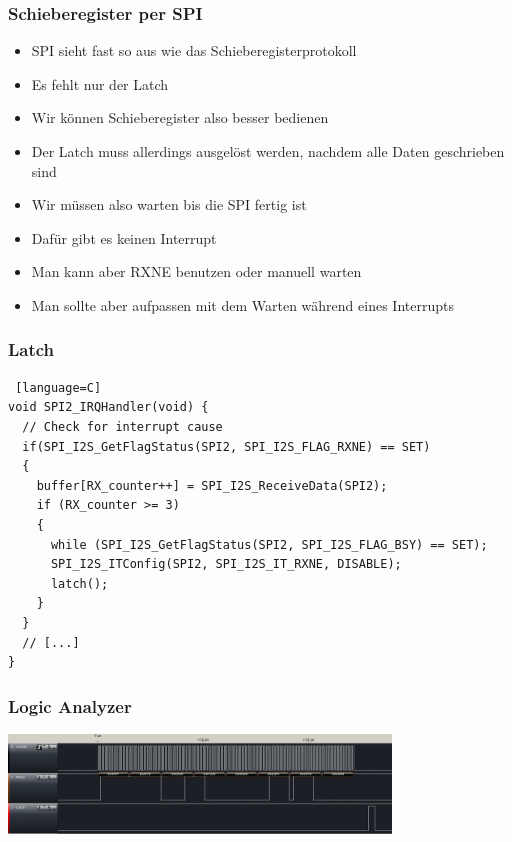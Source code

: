 \documentclass[ngerman,compress]{beamer}
\begin{document}
\begin{frame} [fragile]
	\frametitle{Schieberegister per SPI}
	\begin{itemize}
		\item SPI sieht fast so aus wie das Schieberegisterprotokoll
		\item Es fehlt nur der Latch
		\item Wir können Schieberegister also besser bedienen
		\item Der Latch muss allerdings ausgelöst werden, nachdem alle Daten geschrieben sind
		\item Wir müssen also warten bis die SPI fertig ist
		\item Dafür gibt es keinen Interrupt
		\item Man kann aber RXNE benutzen oder manuell warten
		\item Man sollte aber aufpassen mit dem Warten während eines Interrupts
	\end{itemize}
\end{frame}

\begin{frame} [fragile]
	\frametitle{Latch}
	\begin{lstlisting} [language=C]
void SPI2_IRQHandler(void) {
  // Check for interrupt cause
  if(SPI_I2S_GetFlagStatus(SPI2, SPI_I2S_FLAG_RXNE) == SET)
  {
    buffer[RX_counter++] = SPI_I2S_ReceiveData(SPI2);
    if (RX_counter >= 3)
    {
      while (SPI_I2S_GetFlagStatus(SPI2, SPI_I2S_FLAG_BSY) == SET);
      SPI_I2S_ITConfig(SPI2, SPI_I2S_IT_RXNE, DISABLE);
      latch();
    }
  }
  // [...]
}
	\end{lstlisting}
\end{frame}

\begin{frame} [fragile]
	\frametitle{Logic Analyzer}
        \includegraphics[width=4in]{dump_spi.png}
\end{frame}
\end{document}
